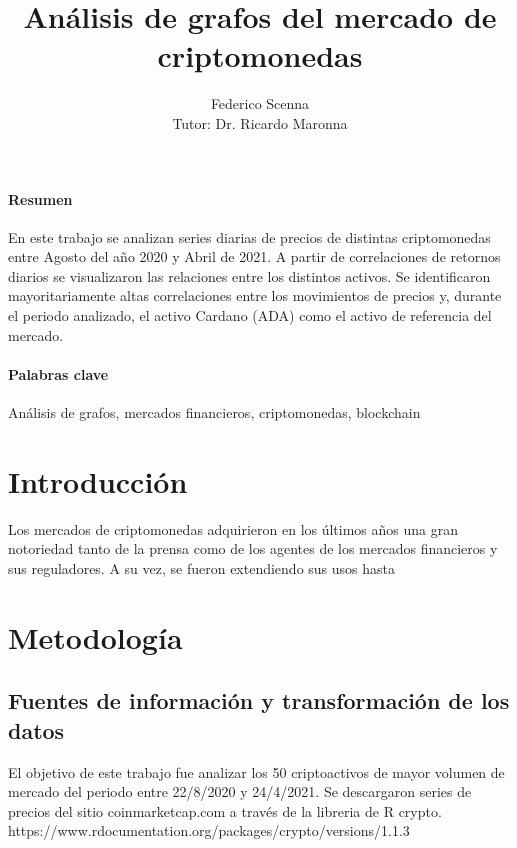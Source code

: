 \documentclass[runningheads,a4paper,10pt]{etc/llncs}
\title{Análisis de grafos del mercado de criptomonedas}
\author{Federico Scenna\\ [1cm] {\small Tutor: Dr. Ricardo Maronna}}
\institute{ Maestría en Exploración de Datos y Descubrimiento del Conocimiento \\
Facultad de Ciencias Exactas y Naturales\\ Universidad de Buenos Aires\\
\mailsa
}
\let\stdsection\section
\renewcommand\section{\newpage\stdsection}
\begin{document}
\let\oldaddcontentsline\addcontentsline
\def\addcontentsline#1#2#3{}
\maketitle
\def\addcontentsline#1#2#3{\oldaddcontentsline{#1}{#2}{#3}}

\newpage

\paragraph{Resumen} 
En este trabajo se analizan series diarias de precios de distintas criptomonedas entre Agosto del año 2020 y Abril de 2021. A partir de correlaciones de retornos diarios se visualizaron las relaciones entre los distintos activos. Se identificaron mayoritariamente altas correlaciones  entre los movimientos de precios y, durante el periodo analizado, el activo Cardano (ADA) como el activo de referencia del mercado.

\paragraph{Palabras clave} Análisis de grafos, mercados financieros, criptomonedas, blockchain

\tableofcontents

\newpage
\section{Introducción}

Los mercados de criptomonedas adquirieron en los últimos años una gran notoriedad tanto de la prensa como de los agentes de los mercados financieros y sus reguladores. A su vez, se fueron extendiendo sus usos hasta 

\section{Metodología}

\subsection{Fuentes de información y transformación de los datos} 

El objetivo de este trabajo fue analizar los 50 criptoactivos de mayor volumen de mercado del periodo entre 22/8/2020 y 24/4/2021. Se descargaron series de precios del sitio coinmarketcap.com a través de la libreria de R crypto.
https://www.rdocumentation.org/packages/crypto/versions/1.1.3
\end{document}
